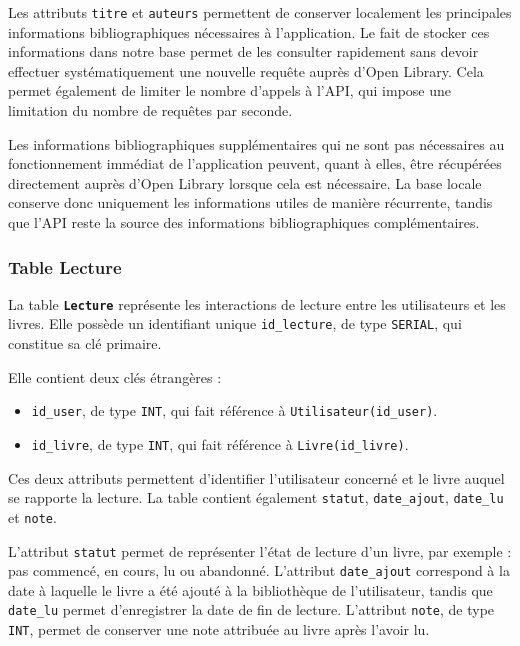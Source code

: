 \documentclass[
  letterpaper,
  DIV=11,
  numbers=noendperiod]{scrartcl}
\providecommand{\tightlist}{%
  \setlength{\itemsep}{0pt}\setlength{\parskip}{0pt}}
\begin{document}
Les attributs \texttt{titre} et \texttt{auteurs} permettent de conserver
localement les principales informations bibliographiques nécessaires à
l'application. Le fait de stocker ces informations dans notre base
permet de les consulter rapidement sans devoir effectuer
systématiquement une nouvelle requête auprès d'Open Library. Cela permet
également de limiter le nombre d'appels à l'API, qui impose une
limitation du nombre de requêtes par seconde.

Les informations bibliographiques supplémentaires qui ne sont pas
nécessaires au fonctionnement immédiat de l'application peuvent, quant à
elles, être récupérées directement auprès d'Open Library lorsque cela
est nécessaire. La base locale conserve donc uniquement les informations
utiles de manière récurrente, tandis que l'API reste la source des
informations bibliographiques complémentaires.

\subsubsection{Table Lecture}\label{table-lecture}

La table \textbf{\texttt{Lecture}} représente les interactions de
lecture entre les utilisateurs et les livres. Elle possède un
identifiant unique \texttt{id\_lecture}, de type \texttt{SERIAL}, qui
constitue sa clé primaire.

Elle contient deux clés étrangères :

\begin{itemize}
\tightlist
\item
  \texttt{id\_user}, de type \texttt{INT}, qui fait référence à
  \texttt{Utilisateur(id\_user)}.
\item
  \texttt{id\_livre}, de type \texttt{INT}, qui fait référence à
  \texttt{Livre(id\_livre)}.
\end{itemize}

Ces deux attributs permettent d'identifier l'utilisateur concerné et le
livre auquel se rapporte la lecture. La table contient également
\texttt{statut}, \texttt{date\_ajout}, \texttt{date\_lu} et
\texttt{note}.

L'attribut \texttt{statut} permet de représenter l'état de lecture d'un
livre, par exemple : pas commencé, en cours, lu ou abandonné. L'attribut
\texttt{date\_ajout} correspond à la date à laquelle le livre a été
ajouté à la bibliothèque de l'utilisateur, tandis que \texttt{date\_lu}
permet d'enregistrer la date de fin de lecture. L'attribut
\texttt{note}, de type \texttt{INT}, permet de conserver une note
attribuée au livre après l'avoir lu.
\end{document}
